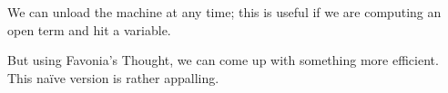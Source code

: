 \documentclass{article}
\newcommand\Clo[2]{#1\triangleleft{#2}}
\newcommand\Cons[2]{{#1}\dblcolon{#2}}
\newcommand\Frame[3]{\perfectparens{#1,#2,#3}}
\newcommand\Cfg[3]{\cut{\Clo{#1}{#2}}{#3}}
\begin{document}
We can unload the machine at any time; this is useful if we are
computing an open term and hit a variable.


But using Favonia's Thought, we can come up with something more
efficient. This na\"ive version is rather appalling.
\end{document}

